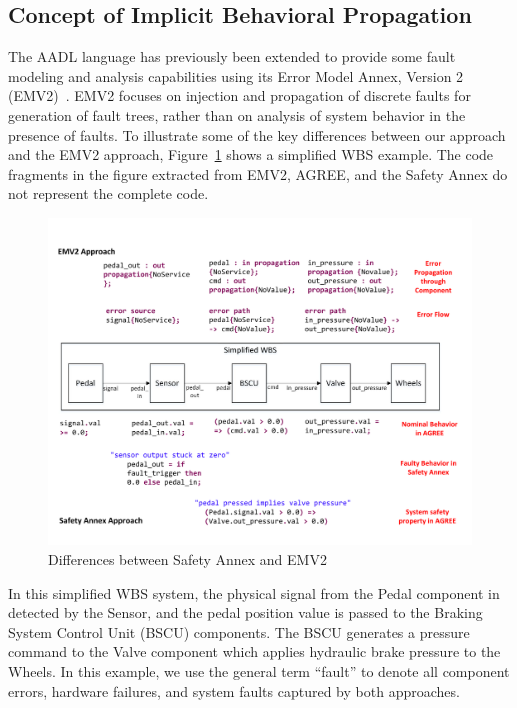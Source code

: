 \subsection{Concept of Implicit Behavioral Propagation}

The AADL language has previously been extended to provide some fault modeling and analysis capabilities using its Error Model Annex, Version 2 (EMV2)~\cite{EMV2}.  EMV2 focuses on injection and propagation of discrete faults for generation of fault trees, rather than on analysis of system behavior in the presence of faults. 
To illustrate some of the key differences between our approach and the EMV2 approach, Figure~\ref{fig:comparison_with_EMV2} shows a simplified WBS example. The code fragments in the figure extracted from EMV2, AGREE, and the Safety Annex do not represent the complete code.

\begin{figure}[t]
	\vspace{-0.19in}
	\centering
	\includegraphics[trim=0 9 0 5,clip,width=\textwidth]{images/Comparison_with_EMV2.pdf}
	\caption{Differences between Safety Annex and EMV2}
	\label{fig:comparison_with_EMV2}
\end{figure} 

In this simplified WBS system, the physical signal from the Pedal component in detected by the Sensor, and the pedal position value is passed to the Braking System Control Unit (BSCU) components.  The BSCU generates a pressure command to the Valve component which applies hydraulic brake pressure to the Wheels. In this example, we use the general term ``fault'' to denote all component errors, hardware failures, and system faults captured by both approaches.

